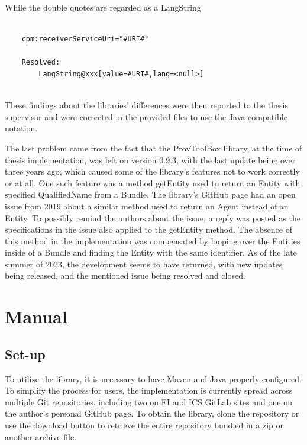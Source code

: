 \documentclass[
  digital,     %
  oneside,     %
  nosansbold,  %
  nocolorbold, %
  lof,         %
  lot,         %
]{fithesis4}
\begin{document}
While the double quotes are regarded as a LangString

\begin{verbatim}

    cpm:receiverServiceUri="#URI#"
    
    Resolved:
        LangString@xxx[value=#URI#,lang=<null>]
        
\end{verbatim}

These findings about the libraries' differences were then reported to the thesis supervisor and were corrected in the provided files to use the Java-compatible notation.

The last problem came from the fact that the ProvToolBox library, at the time of thesis implementation, was left on version 0.9.3, with the last update being over three years ago, which caused some of the library's features not to work correctly or at all. One such feature was a method getEntity used to return an Entity with specified QualifiedName from a Bundle. The library's GitHub page had an open issue from 2019 about a similar method used to return an Agent instead of an Entity. To possibly remind the authors about the issue, a reply was posted as the specifications in the issue also applied to the getEntity method. The absence of this method in the implementation was compensated by looping over the Entities inside of a Bundle and finding the Entity with the same identifier. As of the late summer of 2023, the development seems to have returned, with new updates being released, and the mentioned issue being resolved and closed.
\shorthandon{-}


\chapter{Manual}
\shorthandoff{-}
\section{Set-up}
To utilize the library, it is necessary to have Maven and Java properly configured. To simplify the process for users, the implementation is currently spread across multiple Git repositories, including two on FI and ICS GitLab sites and one on the author's personal GitHub page. To obtain the library, clone the repository or use the download button to retrieve the entire repository bundled in a zip or another archive file.
\end{document}
